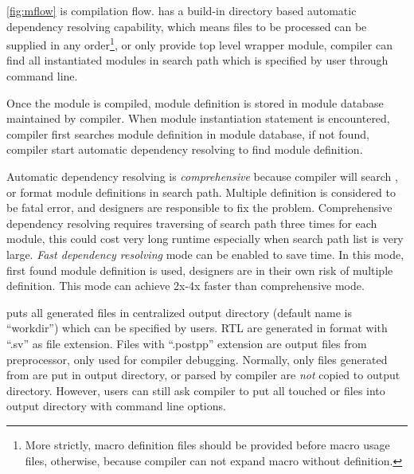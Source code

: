 \autoref{fig:mflow} is \mhdl{} compilation flow. \mhdlc{} has a
build-in directory based automatic dependency resolving capability,
which means files to be processed can be supplied in any
order\footnote{ More strictly, macro definition files should be
  provided before macro usage files, otherwise, because compiler can
  not expand macro without definition.  }, or only provide top level
wrapper module, compiler can find all instantiated modules in search
path which is specified by user through command line.

Once the module is compiled, module definition is stored in module
database maintained by compiler. When module instantiation statement is
encountered, compiler first searches module definition in module
database, if not found, compiler start automatic dependency resolving
to find module definition. 

Automatic dependency resolving is
\emph{comprehensive} because compiler will
search \mhdl{}, \vlog{} or \sv{} format module definitions in search
path. Multiple definition is considered to be fatal error, and
designers are responsible to fix the problem. Comprehensive dependency
resolving requires traversing of search path three times for each
module, this could cost very long runtime especially when search path
list is very large. \emph{Fast dependency resolving} mode can be enabled to save time. In this
mode, first found module definition is used, designers are in their
own risk of multiple definition. This mode can achieve 2x-4x faster
than comprehensive mode. 

\mhdlc{} puts all generated files in centralized output directory
(default name is ``workdir'')
which can be specified by users. RTL are generated in \sv{} format
with ``.sv'' as file extension. Files with ``.postpp'' extension are
output files from preprocessor, only used for compiler
debugging. Normally, only \sv{} files generated from \mhdl{} are put
in output directory, \vlog{} or \sv{} parsed by compiler are
\emph{not} copied to output directory. However, users can still ask
compiler to put all touched \vlog{} or \sv{} files into output
directory with command line options. 
